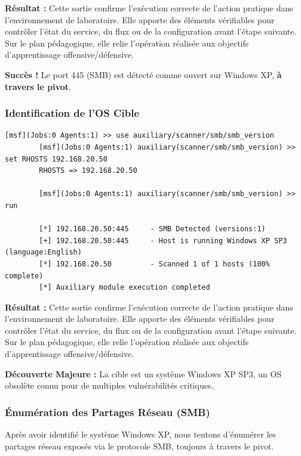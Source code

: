 \documentclass[12pt,a4paper,openany]{report}
\begin{document}
	\textbf{Résultat :} Cette sortie confirme l'exécution correcte de l'action pratique dans l'environnement de laboratoire. Elle apporte des éléments vérifiables pour contrôler l'état du service, du flux ou de la configuration avant l'étape suivante. Sur le plan pédagogique, elle relie l'opération réalisée aux objectifs d'apprentissage offensive/défensive.
	
	
	\textcolor{green}{\checkmark} \textbf{Succès !} Le port 445 (SMB) est détecté comme ouvert sur Windows XP, \textbf{à travers le pivot}.
	
	\subsubsection{Identification de l'OS Cible}
	
	\begin{lstlisting}[caption=Détection de Version SMB]
		[msf](Jobs:0 Agents:1) >> use auxiliary/scanner/smb/smb_version
		[msf](Jobs:0 Agents:1) auxiliary(scanner/smb/smb_version) >> set RHOSTS 192.168.20.50
		RHOSTS => 192.168.20.50
		
		[msf](Jobs:0 Agents:1) auxiliary(scanner/smb/smb_version) >> run
		
		[*] 192.168.20.50:445     - SMB Detected (versions:1)
		[+] 192.168.20.50:445     - Host is running Windows XP SP3 (language:English)
		[*] 192.168.20.50         - Scanned 1 of 1 hosts (100% complete)
		[*] Auxiliary module execution completed
	\end{lstlisting}
	
	\textbf{Résultat :} Cette sortie confirme l'exécution correcte de l'action pratique dans l'environnement de laboratoire. Elle apporte des éléments vérifiables pour contrôler l'état du service, du flux ou de la configuration avant l'étape suivante. Sur le plan pédagogique, elle relie l'opération réalisée aux objectifs d'apprentissage offensive/défensive.
	
	
	\textbf{Découverte Majeure :} La cible est un système Windows XP SP3, un OS obsolète connu pour de multiples vulnérabilités critiques.
	
	\subsubsection{Énumération des Partages Réseau (SMB)}
	
	Après avoir identifié le système Windows XP, nous tentons d'énumérer les
	partages réseau exposés via le protocole SMB, toujours à travers le pivot.
	
\end{document}
